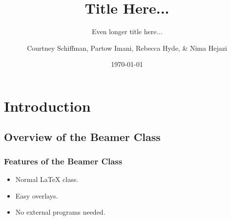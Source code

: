 \documentclass{beamer}
\title{Title Here...}
\subtitle{Even longer title here...}
\author{Courtney Schiffman, Partow Imani, Rebecca Hyde, \& Nima Hejazi}
\institute[UC Berkeley]{University of California, Berkeley}
\date{\today}
\begin{document}
\frame{\titlepage}

\section[Outline]{}
\frame{\tableofcontents}

\section{Introduction}
\subsection{Overview of the Beamer Class}
\frame
{
  \frametitle{Features of the Beamer Class}

  \begin{itemize}
  \item<1-> Normal LaTeX class.
  \item<2-> Easy overlays.
  \item<3-> No external programs needed.      
  \end{itemize}
}
\end{document}

